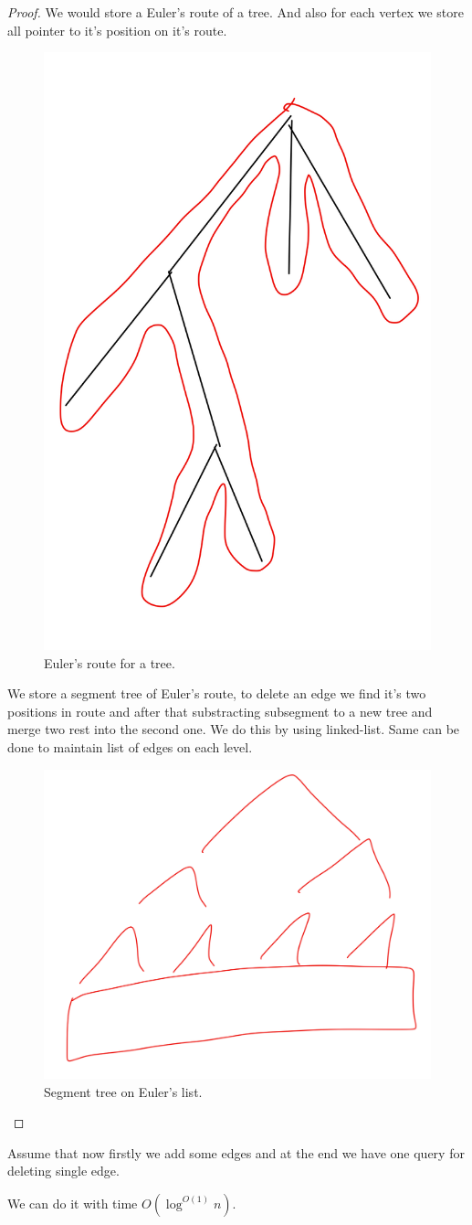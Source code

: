 \begin{proof}
	We would store a Euler's route of a tree.
	And also for each vertex we store all pointer to it's position on it's route.

\begin{figure}[H]
	\centering
	\includegraphics[width=0.3\linewidth]{figures/et_tree_euler.jpeg}
	\caption{Euler's route for a tree.}
	\label{fig:et_tree_euler.jpeg}
\end{figure}

	We store a segment tree of Euler's route, to delete an edge we find it's two positions in route and after that substracting subsegment to a new tree and merge two rest into the second one.
	We do this by using linked-list.
	Same can be done to maintain list of edges on each level.
\begin{figure}[H]
	\centering
	\includegraphics[width=0.3\linewidth]{figures/et_tree_segment_tree.jpeg}
	\caption{Segment tree on Euler's list.}
	\label{fig:et_tree_segment_tree.jpeg}
\end{figure}
\end{proof}

\begin{claim}
  Assume that now firstly we add some edges and at the end we have one query for deleting single edge.

  We can do it with time $O(\log^{O(1)} n)$.
\end{claim}

